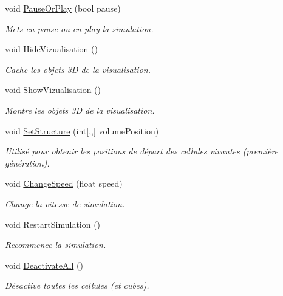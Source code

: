 \begin{DoxyCompactItemize}
void \mbox{\hyperlink{class_simulation_ab668bfea667549d1295fc55f5ccfbc4a}{Pause\+Or\+Play}} (bool pause)
\begin{DoxyCompactList}\small\item\em Mets en pause ou en play la simulation. \end{DoxyCompactList}\item 
void \mbox{\hyperlink{class_simulation_a71a9e0a93e05353ff243f4c48afa67d0}{Hide\+Vizualisation}} ()
\begin{DoxyCompactList}\small\item\em Cache les objets 3D de la visualisation. \end{DoxyCompactList}\item 
void \mbox{\hyperlink{class_simulation_acc3c641f3874f1805c3a13d2153b6023}{Show\+Vizualisation}} ()
\begin{DoxyCompactList}\small\item\em Montre les objets 3D de la visualisation. \end{DoxyCompactList}\item 
void \mbox{\hyperlink{class_simulation_a775498931843884fbc6c08de3b2b1afd}{Set\+Structure}} (int\mbox{[},,\mbox{]} volume\+Position)
\begin{DoxyCompactList}\small\item\em Utilisé pour obtenir les positions de départ des cellules vivantes (première génération). \end{DoxyCompactList}\item 
void \mbox{\hyperlink{class_simulation_a3fde1a020def21f5f41794735b76c686}{Change\+Speed}} (float speed)
\begin{DoxyCompactList}\small\item\em Change la vitesse de simulation. \end{DoxyCompactList}\item 
void \mbox{\hyperlink{class_simulation_a500982098740ae238f349a6fed0affd8}{Restart\+Simulation}} ()
\begin{DoxyCompactList}\small\item\em Recommence la simulation. \end{DoxyCompactList}\item 
void \mbox{\hyperlink{class_simulation_abc1bd1d93c293257a921a8a8935095b6}{Deactivate\+All}} ()
\begin{DoxyCompactList}\small\item\em Désactive toutes les cellules (et cubes). \end{DoxyCompactList}\item 

\end{DoxyCompactItemize}
